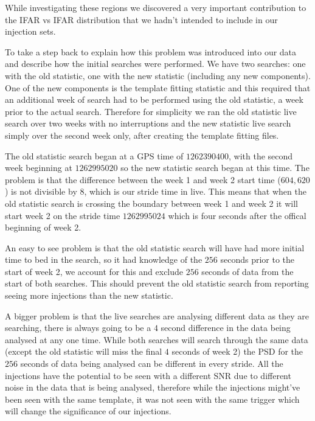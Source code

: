 While investigating these regions we discovered a very important contribution to the IFAR vs IFAR distribution that we hadn't intended to include in our injection sets. 

To take a step back to explain how this problem was introduced into our data and describe how the initial searches were performed. We have two searches: one with the old statistic, one with the new statistic (including any new components). One of the new components is the template fitting statistic and this required that an additional week of search had to be performed using the old statistic, a week prior to the actual search. Therefore for simplicity we ran the old statistic live search over two weeks with no interruptions and the new statistic live search simply over the second week only, after creating the template fitting files.

The old statistic search began at a GPS time of $1262390400$, with the second week beginning at $1262995020$ so the new statistic search began at this time. The problem is that the difference between the week 1 and week 2 start time ($604,620$) is not divisible by $8$, which is our stride time in live. This means that when the old statistic search is crossing the boundary between week 1 and week 2 it will start week 2 on the stride time $1262995024$ which is four seconds after the offical beginning of week 2.

An easy to see problem is that the old statistic search will have had more initial time to bed in the search, so it had knowledge of the $256$ seconds prior to the start of week 2, we account for this and exclude $256$ seconds of data from the start of both searches. This should prevent the old statistic search from reporting seeing more injections than the new statistic.

A bigger problem is that the live searches are analysing different data as they are searching, there is always going to be a $4$ second difference in the data being analysed at any one time. While both searches will search through the same data (except the old statistic will miss the final $4$ seconds of week 2) the PSD for the $256$ seconds of data being analysed can be different in every stride. All the injections have the potential to be seen with a different SNR due to different noise in the data that is being analysed, therefore while the injections might've been seen with the same template, it was not seen with the same trigger which will change the significance of our injections.


